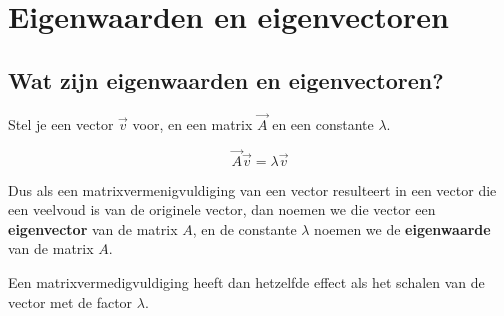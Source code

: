 \chapter{Eigenwaarden en eigenvectoren}
\label{ch:eigenwaarden_eigenvectoren}


\section{Wat zijn eigenwaarden en eigenvectoren?}

Stel je een vector $\vec{v}$ voor, en een matrix $\vec{A}$ en een constante $\lambda$.

\[ \vec{A}\vec{v} = \lambda \vec{v} \]

Dus als een matrixvermenigvuldiging van een vector resulteert in een vector die een veelvoud is van de originele vector,
dan noemen we die vector een \textbf{eigenvector} van de matrix $A$, en de constante $\lambda$ noemen we de \textbf{eigenwaarde} van de matrix $A$.

Een matrixvermedigvuldiging heeft dan hetzelfde effect als het schalen van de vector met de factor $\lambda$.

\begin{voorbeeld}
    
\end{voorbeeld}

